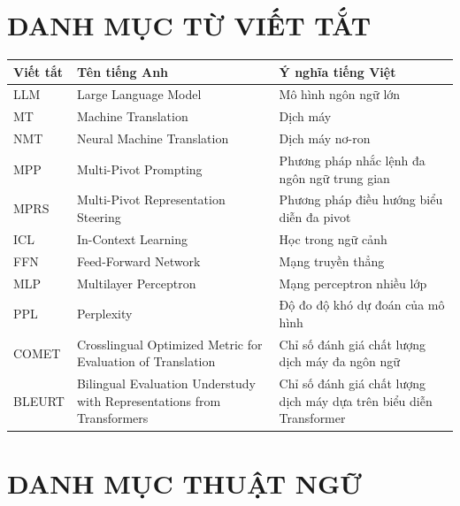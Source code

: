 

\section*{DANH MỤC TỪ VIẾT TẮT}

\renewcommand{\arraystretch}{1.3}

\begin{longtable}{|>{\centering\arraybackslash}p{3cm}|
                    >{\centering\arraybackslash}p{4cm}|
                    p{7cm}|}
\hline
\textbf{Viết tắt} & \textbf{Tên tiếng Anh} & \textbf{Ý nghĩa tiếng Việt} \\
\hline
LLM & Large Language Model & Mô hình ngôn ngữ lớn \\
\hline
MT & Machine Translation & Dịch máy \\
\hline
NMT & Neural Machine Translation & Dịch máy nơ-ron \\
\hline
MPP & Multi-Pivot Prompting & Phương pháp nhắc lệnh đa ngôn ngữ trung gian \\
\hline
MPRS & Multi-Pivot Representation Steering & Phương pháp điều hướng biểu diễn đa pivot \\
\hline
ICL & In-Context Learning & Học trong ngữ cảnh \\
\hline
FFN & Feed-Forward Network & Mạng truyền thẳng \\
\hline
MLP & Multilayer Perceptron & Mạng perceptron nhiều lớp \\
\hline
PPL & Perplexity & Độ đo độ khó dự đoán của mô hình \\
\hline
COMET & Crosslingual Optimized Metric for Evaluation of Translation & Chỉ số đánh giá chất lượng dịch máy đa ngôn ngữ \\
\hline
BLEURT & Bilingual Evaluation Understudy with Representations from Transformers & Chỉ số đánh giá chất lượng dịch máy dựa trên biểu diễn Transformer \\
\hline
\end{longtable}

\vspace{0.5cm}


\section*{DANH MỤC THUẬT NGỮ}

